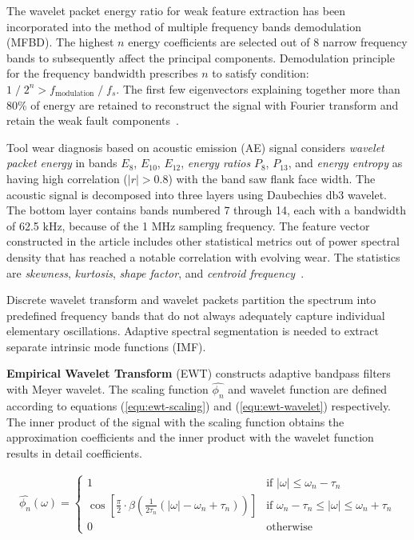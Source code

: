 The wavelet packet energy ratio for weak feature extraction has been incorporated into the method of multiple frequency bands demodulation (MFBD). The highest $n$ energy coefficients are selected out of 8 narrow frequency bands to subsequently affect the principal components. Demodulation principle for the frequency bandwidth prescribes $n$ to satisfy condition: $1\;/\;2^n > f_{\mathrm{modulation}}\;/\;f_s$. The first few eigenvectors explaining together more than 80\% of energy are retained to reconstruct the signal with Fourier transform and retain the weak fault components~\cite{song_mfbd_2021}.

Tool wear diagnosis based on acoustic emission (AE) signal considers \emph{wavelet packet energy} in bands $E_{8}$, $E_{10}$, $E_{12}$, \emph{energy ratios} $P_{8}$, $P_{13}$, and \emph{energy entropy} as having high correlation ($|r| > 0.8$) with the band saw flank face width. The acoustic signal is decomposed into three layers using Daubechies db3 wavelet. The bottom layer contains bands numbered 7 through 14, each with a bandwidth of 62.5 kHz, because of the 1 MHz sampling frequency. The feature vector constructed in the article includes other statistical metrics out of power spectral density that has reached a notable correlation with evolving wear. The statistics are \emph{skewness}, \emph{kurtosis}, \emph{shape factor}, and \emph{centroid frequency}~\cite{zhuo_research_2022}.

Discrete wavelet transform and wavelet packets partition the spectrum into predefined frequency bands that do not always adequately capture individual elementary oscillations. Adaptive spectral segmentation is needed to extract separate intrinsic mode functions (IMF).

\textbf{Empirical Wavelet Transform} (EWT) constructs adaptive bandpass filters with Meyer wavelet. The scaling function $\hat{\phi_n}$ and wavelet function are defined according to equations (\ref{equ:ewt-scaling}) and (\ref{equ:ewt-wavelet}) respectively. The inner product of the signal with the scaling function obtains the approximation coefficients and the inner product with the wavelet function results in detail coefficients.

\begin{ceqn}\begin{align}
\hat{\phi_n}(\omega) = 
\begin{cases}
1       & \text{if } |\omega| \leq \omega_n - \tau_n \\
\cos\left[\frac{\pi}{2}\cdot \beta\left(\frac{1}{2\tau_n}(|\omega| - \omega_n + \tau_n)\right)\right]  &  \text{if } \omega_n  - \tau_n \leq |\omega| \leq \omega_n + \tau_n \\
0       & \text{otherwise }
\end{cases}
\label{equ:ewt-scaling}
\end{align}\end{ceqn}

